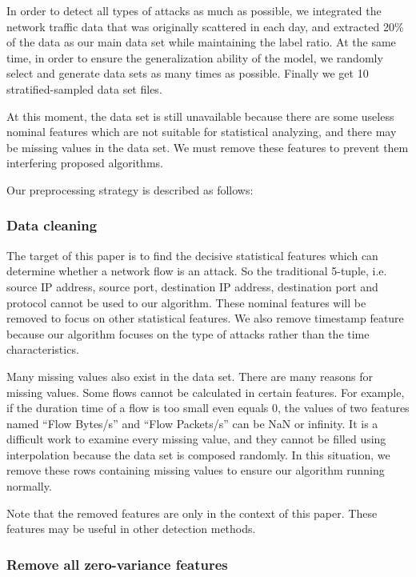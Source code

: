 \documentclass{ieeeaccess}
\theoremstyle{definition}
\begin{document}
\begin{table}[!htpb]
\end{table}

In order to detect all types of attacks as much as possible, we integrated the network traffic data that was originally scattered in each day, and extracted 20\% of the data as our main data set while maintaining the label ratio. At the same time, in order to ensure the generalization ability of the model, we randomly select and generate data sets as many times as possible. Finally we get 10 stratified-sampled data set files. 

At this moment, the data set is still unavailable because there are some useless nominal features which are not suitable for statistical analyzing, and there may be missing values in the data set. We must remove these features to prevent them interfering proposed algorithms.

Our preprocessing strategy is described as follows:

\subsubsection{Data cleaning}
The target of this paper is to find the decisive statistical features which can determine whether a network flow is an attack. 
So the traditional 5-tuple, i.e. source IP address, source port, destination IP address, destination port and protocol cannot be used to our algorithm. 
These nominal features will be removed to focus on other statistical features. 
We also remove timestamp feature because our algorithm focuses on the type of attacks rather than the time characteristics.

Many missing values also exist in the data set. There are many reasons for missing values. Some flows cannot be calculated in certain features. For example, if the duration time of a flow is too small even equals 0, the values of two features named ``Flow Bytes/s'' and ``Flow Packets/s'' can be NaN or infinity. It is a difficult work to examine every missing value, and they cannot be filled using interpolation because the data set is composed randomly. In this situation, we remove these rows containing missing values to ensure our algorithm running normally.

Note that the removed features are only in the context of this paper. These features may be useful in other detection methods.

\subsubsection{Remove all zero-variance features}
\end{document}
